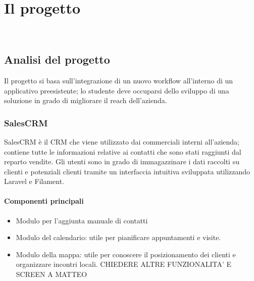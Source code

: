 \chapter{Il progetto}
\label{cap:descrizione-stage}

\\

\section{Analisi del progetto}

Il progetto si basa sull'integrazione di un nuovo workflow all'interno di un applicativo preesistente; lo studente deve occuparsi dello sviluppo di una soluzione in grado di migliorare il reach dell'azienda.

\subsection{SalesCRM}
SalesCRM è il CRM che viene utilizzato dai commerciali interni all'azienda; contiene tutte le informazioni relative ai contatti che sono stati raggiunti dal reparto vendite. 
Gli utenti sono in grado di immagazzinare i dati raccolti su clienti e potenziali clienti tramite un interfaccia intuitiva sviluppata utilizzando Laravel e Filament.

\subsubsection{Componenti principali}
\begin{itemize}
    \item Modulo per l'aggiunta manuale di contatti
    \item Modulo del calendario: utile per pianificare appuntamenti e visite.
    \item Modulo della mappa: utile per conoscere il posizionamento dei clienti e organizzare incontri locali.
    CHIEDERE ALTRE FUNZIONALITA' E SCREEN A MATTEO 
\end{itemize}

